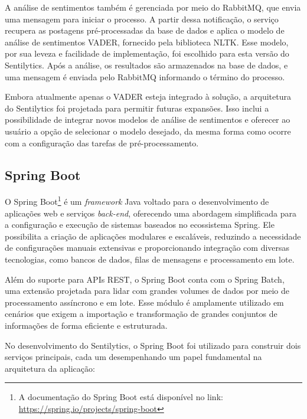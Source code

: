 \documentclass[
	12pt,				%
	oneside,			%
	a4paper,			%
	english,			%
	french,				%
	spanish,			%
	brazil				%
	]{abntex2}
\begin{document}
A análise de sentimentos também é gerenciada por meio do RabbitMQ, que
envia uma mensagem para iniciar o processo. A partir dessa notificação,
o serviço recupera as postagens pré-processadas da base de dados e
aplica o modelo de análise de sentimentos VADER, fornecido pela
biblioteca NLTK. Esse modelo, por sua leveza e facilidade de
implementação, foi escolhido para esta versão do Sentilytics. Após a
análise, os resultados são armazenados na base de dados, e uma mensagem
é enviada pelo RabbitMQ informando o término do processo.

Embora atualmente apenas o VADER esteja integrado à solução, a
arquitetura do Sentilytics foi projetada para permitir futuras
expansões. Isso inclui a possibilidade de integrar novos modelos de
análise de sentimentos e oferecer ao usuário a opção de selecionar o
modelo desejado, da mesma forma como ocorre com a configuração das
tarefas de pré-processamento.

\hypertarget{spring-boot}{%
\subsection{Spring Boot}\label{spring-boot}}

O Spring Boot\footnote{A documentação do Spring Boot está disponível no
  link: \url{https://spring.io/projects/spring-boot}} é um
\emph{framework} Java voltado para o desenvolvimento de aplicações web e
serviços \emph{back-end}, oferecendo uma abordagem simplificada para a
configuração e execução de sistemas baseados no ecossistema Spring. Ele
possibilita a criação de aplicações modulares e escaláveis, reduzindo a
necessidade de configurações manuais extensivas e proporcionando
integração com diversas tecnologias, como bancos de dados, filas de
mensagens e processamento em lote.

Além do suporte para APIs REST, o Spring Boot conta com o Spring Batch,
uma extensão projetada para lidar com grandes volumes de dados por meio
de processamento assíncrono e em lote. Esse módulo é amplamente
utilizado em cenários que exigem a importação e transformação de grandes
conjuntos de informações de forma eficiente e estruturada.

No desenvolvimento do Sentilytics, o Spring Boot foi utilizado para
construir dois serviços principais, cada um desempenhando um papel
fundamental na arquitetura da aplicação:
\end{document}
